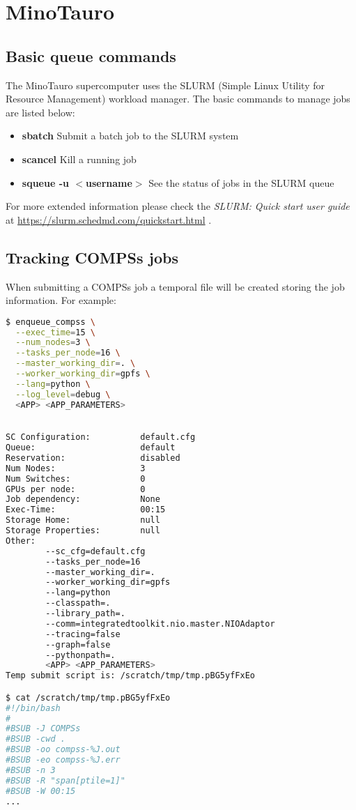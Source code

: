 \section{MinoTauro}
\label{sec:minotauro}

\subsection{Basic queue commands}

The MinoTauro supercomputer uses the SLURM (Simple Linux Utility for Resource Management) workload manager. The basic commands 
to manage jobs are listed below:

\begin{itemize}
 \item \textbf{sbatch} Submit a batch job to the SLURM system
 \item \textbf{scancel} Kill a running job 
 \item \textbf{squeue -u $<$username$>$} See the status of jobs in the SLURM queue
\end{itemize}

For more extended information please check the \textit{SLURM: Quick start user guide} at 
\url{https://slurm.schedmd.com/quickstart.html} .


\subsection{Tracking COMPSs jobs}

When submitting a COMPSs job a temporal file will be created storing the job information. For example:

\begin{lstlisting}[language=bash]
$ enqueue_compss \
  --exec_time=15 \
  --num_nodes=3 \
  --tasks_per_node=16 \
  --master_working_dir=. \
  --worker_working_dir=gpfs \
  --lang=python \
  --log_level=debug \
  <APP> <APP_PARAMETERS>

  
SC Configuration:          default.cfg
Queue:                     default
Reservation:               disabled
Num Nodes:                 3
Num Switches:              0
GPUs per node:             0
Job dependency:            None
Exec-Time:                 00:15
Storage Home:              null
Storage Properties:        null
Other:                     
        --sc_cfg=default.cfg
        --tasks_per_node=16
        --master_working_dir=.
        --worker_working_dir=gpfs
        --lang=python
        --classpath=.
        --library_path=.
        --comm=integratedtoolkit.nio.master.NIOAdaptor
        --tracing=false
        --graph=false
        --pythonpath=.
        <APP> <APP_PARAMETERS>
Temp submit script is: /scratch/tmp/tmp.pBG5yfFxEo

$ cat /scratch/tmp/tmp.pBG5yfFxEo
#!/bin/bash
#
#BSUB -J COMPSs
#BSUB -cwd . 
#BSUB -oo compss-%J.out
#BSUB -eo compss-%J.err
#BSUB -n 3
#BSUB -R "span[ptile=1]"
#BSUB -W 00:15 
...
\end{lstlisting}

